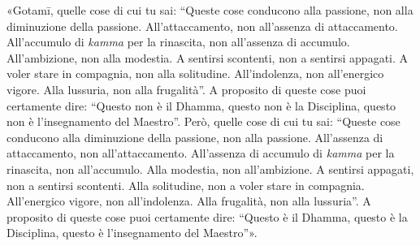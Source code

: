 «Gotamī, quelle cose di cui tu sai: “Queste cose conducono alla passione, non
alla diminuzione della passione. All’attaccamento, non all’assenza di
attaccamento. All’accumulo di \emph{kamma} per la rinascita, non all’assenza di
accumulo. All’ambizione, non alla modestia. A sentirsi scontenti, non a sentirsi
appagati. A voler stare in compagnia, non alla solitudine. All’indolenza, non
all’energico vigore. Alla lussuria, non alla frugalità”. A proposito di queste
cose puoi certamente dire: “Questo non è il Dhamma, questo non è la Disciplina,
questo non è l’insegnamento del Maestro”. Però, quelle cose di cui tu sai:
“Queste cose conducono alla diminuzione della passione, non alla passione.
All’assenza di attaccamento, non all’attaccamento. All’assenza di accumulo di
\emph{kamma} per la rinascita, non all’accumulo. Alla modestia, non
all’ambizione. A sentirsi appagati, non a sentirsi scontenti. Alla solitudine,
non a voler stare in compagnia. All’energico vigore, non all’indolenza. Alla
frugalità, non alla lussuria”. A proposito di queste cose puoi certamente dire:
“Questo è il Dhamma, questo è la Disciplina, questo è l’insegnamento del
Maestro”».


